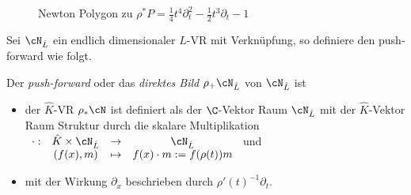 \begin{exmp}
\begin{figure}[htbp]
\begin{minipage}[hbt]{0,49\textwidth}
  \label{fig:Pull-Back1}
  \end{minipage}
  \begin{minipage}[hbt]{0,49\textwidth}
  \begin{center}
  \end{center}
  \caption[Newton Polygon zu $\rho^*P=%
    \frac{1}{4}t^4\partial_t^2-\frac{1}{2}t^3\partial_t-1$]
    {Newton Polygon zu \newline $\rho^*P=%
    \frac{1}{4}t^4\partial_t^2-\frac{1}{2}t^3\partial_t-1$}
  \label{fig:Pull-Back2}
  \end{minipage}
\end{figure}
\end{exmp}

Sei $\cN_{\hat L}$ ein endlich dimensionaler $\hat L$-VR mit Verknüpfung, so
definiere den push-forward wie folgt.
\begin{defn}
Der \emph{push-forward} oder das \emph{direktes Bild} $\rho_+\cN_{\hat L}$ von
$\cN_{\hat L}$ ist
\begin{itemize}
\item der $\hat K$-VR $\rho_*\cN$ ist definiert als der $\C$-Vektor Raum
$\cN_{\hat L}$ mit der $\hat K$-Vektor Raum Struktur durch
die skalare Multiplikation
$\begin{array}[t]{cccc}
\cdot: & \hat{K}\times\cN_{\hat{L}} & \rightarrow & \cN_{\hat{L}}\\
 & (f(x),m) & \mapsto & f(x)\cdot m:=f(\rho(t))m
\end{array}$ und
\item mit der Wirkung $\partial_x$ beschrieben durch
$\rho'(t)^{-1}\partial_t$.
\end{itemize}
\end{defn}

